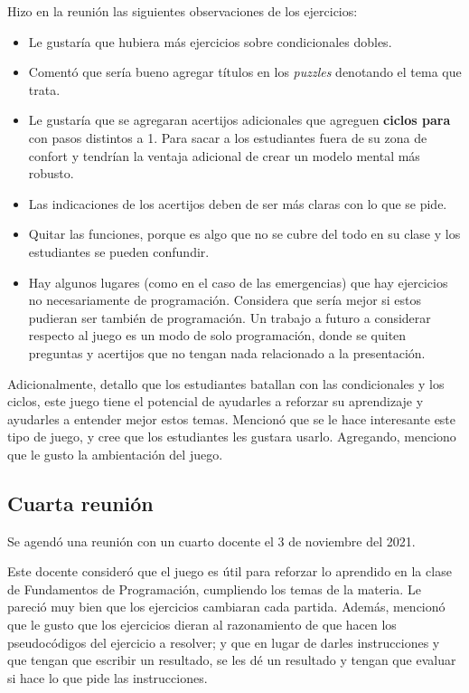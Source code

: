 Hizo en la reunión las siguientes observaciones de los ejercicios:
\begin{itemize}
    \item Le gustaría que hubiera más ejercicios sobre condicionales dobles.
    \item Comentó que sería bueno agregar títulos en los \textit{puzzles} denotando el tema que trata.
    \item Le gustaría que se agregaran acertijos adicionales que agreguen \textbf{ciclos para} con pasos distintos a 1. Para sacar a los estudiantes fuera de su zona de confort y tendrían la ventaja adicional de crear un modelo mental más robusto.
    \item Las indicaciones de los acertijos deben de ser más claras con lo que se pide.
    \item Quitar las funciones, porque es algo que no se cubre del todo en su clase y los estudiantes se pueden confundir.
    \item Hay algunos lugares (como en el caso de las emergencias) que hay ejercicios no necesariamente de programación. Considera que sería mejor si estos pudieran ser también de programación. Un trabajo a futuro a considerar respecto al juego es un modo de solo programación, donde se quiten preguntas y acertijos que no tengan nada relacionado a la presentación.
\end{itemize}

Adicionalmente, detallo que los estudiantes batallan con las condicionales y los ciclos, este juego tiene el potencial de ayudarles a reforzar su aprendizaje y ayudarles a entender mejor estos temas. Mencionó que se le hace interesante este tipo de juego, y cree que los estudiantes les gustara usarlo. Agregando, menciono que le gusto la ambientación del juego.

\subsection{Cuarta reunión}
Se agendó una reunión con un cuarto docente el 3 de noviembre del 2021. 

Este docente consideró que el juego es útil para reforzar lo aprendido en la clase de Fundamentos de Programación, cumpliendo los temas de la materia. Le pareció muy bien que los ejercicios cambiaran cada partida. Además, mencionó que le gusto que los ejercicios dieran al razonamiento de que hacen los pseudocódigos del ejercicio a resolver; y que en lugar de darles instrucciones y que tengan que escribir un resultado, se les dé un resultado y tengan que evaluar si hace lo que pide las instrucciones.

